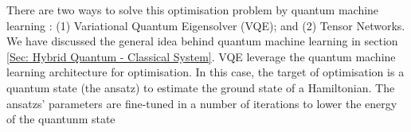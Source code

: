 There are two ways to solve this optimisation problem by quantum machine learning \cite{mugelDynamicPortfolioOptimization2022}: (1) Variational Quantum Eigensolver (VQE); and (2) Tensor Networks.
We have discussed the general idea behind quantum machine learning in section \ref{Sec: Hybrid Quantum - Classical System}.
VQE leverage the quantum machine learning architecture for optimisation.
In this case, the target of optimisation is a quantum state (the ansatz) to estimate the ground state of a Hamiltonian.
The ansatzs' parameters are fine-tuned in a number of iterations to lower the energy of the quantunm state
